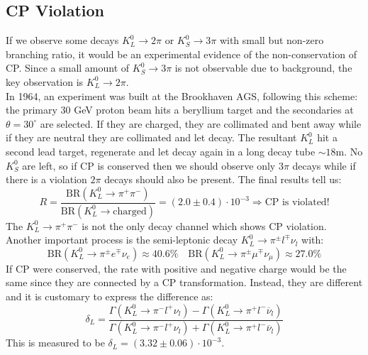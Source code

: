 \documentclass[10.75pt,a4paper,openright,bottom=2cm]{article}
\begin{document}
\subsection{CP Violation}
If we observe some decays $K_L^0\to2\pi$ or $K_S^0\to3\pi$ with small but non-zero branching ratio, it would be an experimental evidence of the non-conservation of CP. Since a small amount of $K_S^0\to3\pi$ is not observable due to background, the key observation is $K_L^0\to2\pi$.\\
In 1964, an experiment was built at the Brookhaven AGS, following this scheme: the primary 30 GeV proton beam hits a beryllium target and the secondaries at $\theta=30^\circ$ are selected. If they are charged, they are collimated and bent away while if they are neutral they are collimated and let decay. The resultant $K_L^0$ hit a second lead target, regenerate and let decay again in a long decay tube $\sim18$\;m. No $K_S^0$  are left, so if CP is conserved then we should observe only $3\pi$ decays while if there is a violation $2\pi$ decays should also be present. The final results tell us:
\[
R=\frac{\text{BR}(K_L^0\to\pi^+\pi^-)}{\text{BR}(K_L^0\to\text{charged})}=(2.0\pm0.4)\cdot10^{-3}\Rightarrow\text{CP is violated!}
\]
The $K_L^0\to\pi^+\pi^-$ is not the only decay channel which shows CP violation. Another important process is the semi-leptonic decay $K_L^0\to\pi^\pm l^\mp\nu_l$ with:
\[
\text{BR}(K_L^0\to\pi^\pm e^\mp\nu_e)\approx40.6\% \quad \text{BR}(K_L^0\to\pi^\pm\mu^\mp\nu_\mu)\approx27.0\%
\]
If CP were conserved, the rate with positive and negative charge would be the same since they are connected by a CP transformation. Instead, they are different and it is customary to express the difference as:
\[
\delta_L=\frac{\Gamma(K_L^0\to\pi^- l^+\nu_l)-\Gamma(K_L^0\to\pi^+ l^-\overline{\nu}_l)}{\Gamma(K_L^0\to\pi^- l^+\nu_l)+\Gamma(K_L^0\to\pi^+ l^-\overline{\nu}_l)}
\]
This is measured to be $\delta_L=(3.32\pm0.06)\cdot10^{-3}$.
\end{document}
